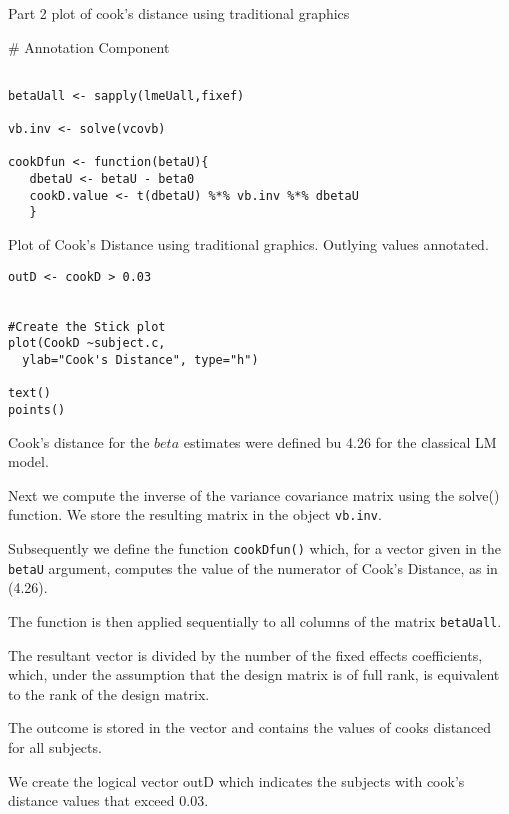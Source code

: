 \documentclass[a4paper,12pt]{article}
\begin{document}
Part 2 plot of cook's distance using traditional graphics

# Annotation Component

\begin{framed}
\begin{verbatim}

betaUall <- sapply(lmeUall,fixef)

vb.inv <- solve(vcovb)

cookDfun <- function(betaU){
   dbetaU <- betaU - beta0
   cookD.value <- t(dbetaU) %*% vb.inv %*% dbetaU
   }
\end{verbatim}
\end{framed}

Plot of Cook's Distance using traditional graphics. 
Outlying values annotated.

\begin{framed}
\begin{verbatim}
outD <- cookD > 0.03


#Create the Stick plot
plot(CookD ~subject.c, 
  ylab="Cook's Distance", type="h")

text()
points()
\end{verbatim}
\end{framed}

Cook's distance for the $beta$ estimates were defined bu 4.26 for the classical LM model.


Next we compute the inverse of the variance covariance matrix \hat{\beta} using the solve() function.
We store the resulting matrix in the object \texttt{vb.inv}.

Subsequently we define the function \texttt{cookDfun()} which, for a vector given in
the \texttt{betaU} argument, computes the value of the numerator of Cook's Distance, as in (4.26).

The function is then applied sequentially to all columns of the matrix \texttt{betaUall}.


The resultant vector is divided by the number of the fixed effects coefficients, which, under the assumption that the design matrix is of full rank, 
is equivalent to the rank of the design matrix.



The outcome is stored in the vector  and contains the values of cooks distanced for all subjects.

We create the logical vector outD which indicates the subjects with cook's distance values that exceed 0.03.
\end{document}
